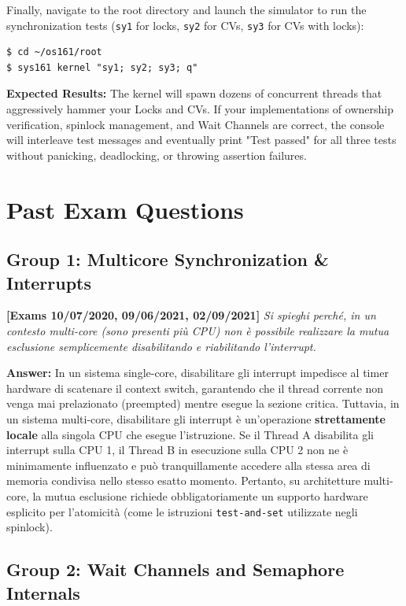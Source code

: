 Finally, navigate to the root directory and launch the simulator to run the synchronization tests (\texttt{sy1} for locks, \texttt{sy2} for CVs, \texttt{sy3} for CVs with locks):
\begin{verbatim}
$ cd ~/os161/root
$ sys161 kernel "sy1; sy2; sy3; q"
\end{verbatim}

\textbf{Expected Results:}
The kernel will spawn dozens of concurrent threads that aggressively hammer your Locks and CVs. If your implementations of ownership verification, spinlock management, and Wait Channels are correct, the console will interleave test messages and eventually print "Test passed" for all three tests without panicking, deadlocking, or throwing assertion failures.

\newpage
\section*{Past Exam Questions}

\subsection*{Group 1: Multicore Synchronization \& Interrupts}

\textbf{[Exams 10/07/2020, 09/06/2021, 02/09/2021]}
\textit{Si spieghi perché, in un contesto multi-core (sono presenti più CPU) non è possibile realizzare la mutua esclusione semplicemente disabilitando e riabilitando l’interrupt.}

\textbf{Answer:}
In un sistema single-core, disabilitare gli interrupt impedisce al timer hardware di scatenare il context switch, garantendo che il thread corrente non venga mai prelazionato (preempted) mentre esegue la sezione critica. Tuttavia, in un sistema multi-core, disabilitare gli interrupt è un'operazione \textbf{strettamente locale} alla singola CPU che esegue l'istruzione. Se il Thread A disabilita gli interrupt sulla CPU 1, il Thread B in esecuzione sulla CPU 2 non ne è minimamente influenzato e può tranquillamente accedere alla stessa area di memoria condivisa nello stesso esatto momento. Pertanto, su architetture multi-core, la mutua esclusione richiede obbligatoriamente un supporto hardware esplicito per l'atomicità (come le istruzioni \texttt{test-and-set} utilizzate negli spinlock).

\newpage
\subsection*{Group 2: Wait Channels and Semaphore Internals}

